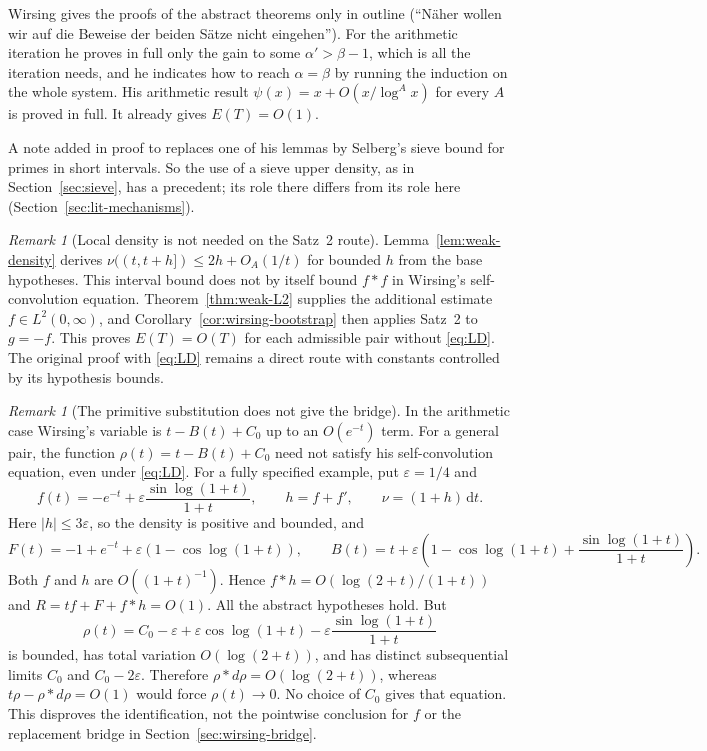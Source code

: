 \documentclass[11pt,letterpaper]{article}
\numberwithin{equation}{section}
\theoremstyle{definition}
\theoremstyle{remark}
\newtheorem{remark}[theorem]{Remark}
\newcommand{\dd}{\,\mathrm d}
\begin{document}
Wirsing gives the proofs of the abstract theorems only in outline (``N\"aher
wollen wir auf die Beweise der beiden S\"atze nicht eingehen''). For the
arithmetic iteration he proves in full only the gain to some $\alpha'>\beta-1$,
which is all the iteration needs, and he indicates how to reach
$\alpha=\beta$ by running the induction on the whole system. His
arithmetic result $\psi(x)=x+O(x/\log^Ax)$ for every $A$ is proved in full.
It already gives $E(T)=O(1)$.

A note added in proof to \cite{wirsing2} replaces one of his lemmas by
Selberg's sieve bound for primes in short intervals. So the use of a sieve
upper density, as in Section~\ref{sec:sieve}, has a precedent; its role
there differs from its role here (Section~\ref{sec:lit-mechanisms}).

\begin{remark}[Local density is not needed on the Satz~2 route]\label{rem:ld-not-needed}
Lemma~\ref{lem:weak-density} derives
$\nu((t,t+h])\le2h+O_A(1/t)$ for bounded $h$ from the base hypotheses.
This interval bound does not by itself bound $f*f$ in Wirsing's
self-convolution equation. Theorem~\ref{thm:weak-L2} supplies the additional estimate
$f\in L^2(0,\infty)$, and Corollary~\ref{cor:wirsing-bootstrap} then
applies Satz~2 to $g=-f$. This proves $E(T)=O(T)$ for each admissible
pair without \eqref{eq:LD}. The original proof with \eqref{eq:LD}
remains a direct route with constants controlled by its hypothesis bounds.
\end{remark}

\begin{remark}[The primitive substitution does not give the bridge]
\label{rem:primitive-obstruction}
In the arithmetic case Wirsing's variable is $t-B(t)+C_0$ up to an
$O(e^{-t})$ term. For a general pair, the function $\rho(t)=t-B(t)+C_0$
need not satisfy his self-convolution equation, even under \eqref{eq:LD}.
For a fully specified example, put $\varepsilon=1/4$ and
\[
 f(t)=-e^{-t}+\varepsilon\frac{\sin\log(1+t)}{1+t},\qquad
 h=f+f',\qquad \nu=(1+h)\dd t.
\]
Here $|h|\le3\varepsilon$, so the density is positive and bounded, and
\[
 F(t)=-1+e^{-t}+\varepsilon(1-\cos\log(1+t)),\qquad
 B(t)=t+\varepsilon\left(1-\cos\log(1+t)
                   +\frac{\sin\log(1+t)}{1+t}\right).
\]
Both $f$ and $h$ are $O((1+t)^{-1})$. Hence
$f*h=O(\log(2+t)/(1+t))$ and $R=tf+F+f*h=O(1)$.
All the abstract hypotheses hold. But
\[
 \rho(t)=C_0-\varepsilon+\varepsilon\cos\log(1+t)
                  -\varepsilon\frac{\sin\log(1+t)}{1+t}
\]
is bounded, has total variation $O(\log(2+t))$, and has distinct
subsequential limits $C_0$ and $C_0-2\varepsilon$. Therefore
$\rho*d\rho=O(\log(2+t))$, whereas
$t\rho-\rho*d\rho=O(1)$ would force $\rho(t)\to0$.
No choice of $C_0$ gives that equation. This disproves the
identification, not the pointwise conclusion for $f$ or the replacement
bridge in Section~\ref{sec:wirsing-bridge}.
\end{remark}
\end{document}
